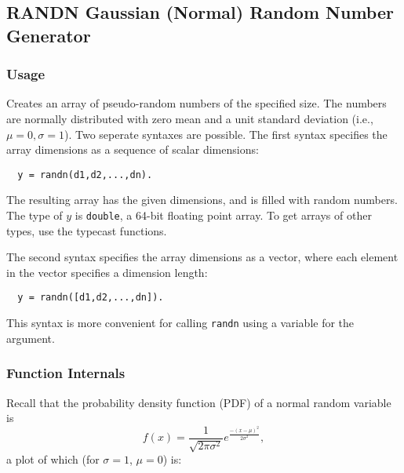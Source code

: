 %
%
%
\subsection{RANDN Gaussian (Normal) Random Number Generator}
\subsubsection{Usage}
Creates an array of pseudo-random numbers of the specified size.
The numbers are normally distributed with zero mean and a unit
standard deviation (i.e., $\mu = 0, \sigma = 1$). 
 Two seperate syntaxes are possible.  The first syntax specifies the array 
dimensions as a sequence of scalar dimensions:
\begin{verbatim}
  y = randn(d1,d2,...,dn).
\end{verbatim}
The resulting array has the given dimensions, and is filled with
random numbers.  The type of $y$ is \verb|double|, a 64-bit floating
point array.  To get arrays of other types, use the typecast 
functions.
    
The second syntax specifies the array dimensions as a vector,
where each element in the vector specifies a dimension length:
\begin{verbatim}
  y = randn([d1,d2,...,dn]).
\end{verbatim}
This syntax is more convenient for calling \verb|randn| using a 
variable for the argument.
\subsubsection{Function Internals}
Recall that the
probability density function (PDF) of a normal random variable is
\[
f(x) = \frac{1}{\sqrt{2\pi \sigma^2}} e^{\frac{-(x-\mu)^2}{2\sigma^2}},
\]
a plot of which (for $\sigma = 1$, $\mu = 0$) is:

